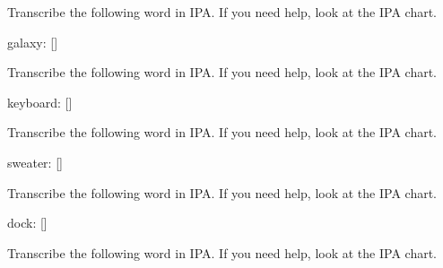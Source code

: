 \documentclass[12pt,a4paper,article]{memoir} %
\begin{document}
\begin{enumerate}
{\vspace{0.5cm}

\makebox[\linewidth]{\rule{\paperwidth}{0.4pt}}

\vspace{0.5cm}

\item Transcribe the following word in IPA. If you need help, look at the IPA chart.

{\normalfont galaxy: [\underline{\hspace{1cm}}]}

\vspace{0.5cm}

\makebox[\linewidth]{\rule{\paperwidth}{0.4pt}}

\vspace{0.5cm}

\item Transcribe the following word in IPA. If you need help, look at the IPA chart.

{\normalfont keyboard: [\underline{\hspace{1cm}}]}

\vspace{0.5cm}

\makebox[\linewidth]{\rule{\paperwidth}{0.4pt}}

\vspace{0.5cm}

\item Transcribe the following word in IPA. If you need help, look at the IPA chart.

{\normalfont sweater: [\underline{\hspace{1cm}}]}

\vspace{0.5cm}

\makebox[\linewidth]{\rule{\paperwidth}{0.4pt}}

\vspace{0.5cm}

\item Transcribe the following word in IPA. If you need help, look at the IPA chart.

{\normalfont dock: [\underline{\hspace{1cm}}]}

\vspace{0.5cm}

\makebox[\linewidth]{\rule{\paperwidth}{0.4pt}}

\vspace{0.5cm}

\item Transcribe the following word in IPA. If you need help, look at the IPA chart.

}
\end{enumerate}
\end{document}
